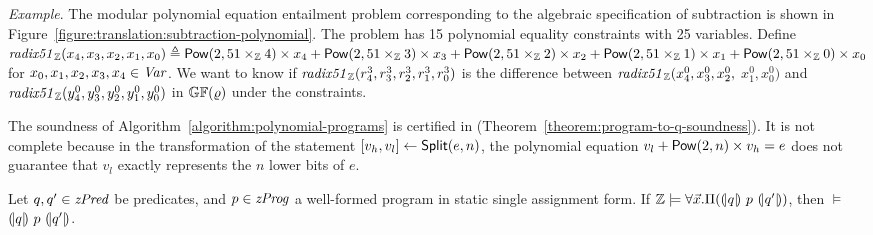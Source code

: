 \noindent
\emph{Example}.
The modular polynomial equation entailment problem corresponding to the
algebraic specification of subtraction is shown in
Figure~\ref{figure:translation:subtraction-polynomial}. The problem
has 15 polynomial equality constraints with 25 variables.
Define $\mathit{radix51}_{\mathbb{Z}}({x}_4, {x}_3, {x}_2, {x}_1, {x}_0) \triangleq \mbox{\textsf{Pow}}(2, 51 \times_{\mathbb{Z}} 4) \times {x}_4 + \mbox{\textsf{Pow}}(2, 51 \times_{\mathbb{Z}} 3) \times {x}_3 + \mbox{\textsf{Pow}}(2, 51 \times_{\mathbb{Z}} 2) \times {x}_2 + \mbox{\textsf{Pow}}(2, 51 \times_{\mathbb{Z}} 1) \times {x}_1 + \mbox{\textsf{Pow}}(2, 51 \times_{\mathbb{Z}} 0) \times {x}_0$ for ${x}_0, {x}_1, {x}_2, {x}_3, {x}_4 \in \mathit{Var}$.
We want to know if $\mathit{radix51}_{\mathbb{Z}}({r}^3_4, {r}^3_3, {r}^3_2,
{r}^3_1, {r}^3_0)$ is the difference between $\mathit{radix51}_{\mathbb{Z}}({x}^0_4,
{x}^0_3, {x}^0_2,$ ${x}^0_1, {x}^0_0)$ and $\mathit{radix51}_{\mathbb{Z}}({y}^0_4,
{y}^0_3, {y}^0_2, {y}^0_1, {y}^0_0)$ in $\mathbb{GF}(\varrho)$ under the
constraints.

The soundness of Algorithm~\ref{algorithm:polynomial-programs}
is certified in \coq (Theorem~\ref{theorem:program-to-q-soundness}).
It is not complete because in the transformation of the statement ${[}{v_h}, {v_l}{]} \leftarrow \mbox{\textsf{Split}}(e, n)$, the polynomial equation $v_l + \mbox{\textsf{Pow}}(2, n) \times v_h = e$ does not guarantee that $v_l$ exactly represents the $n$ lower bits of $e$.
\begin{theorem}
  \label{theorem:program-to-q-soundness}
  Let $q, q' \in \mathit{zPred}$ be predicates, and $p \in \mathit{zProg}$ a well-formed
  program in static single assignment form.
  If $\mathbb{Z} \models \forall \vec{x}.\Pi({(\!|}{q}{|\!)}~{p}~{(\!|}{q'}{|\!)})$, then
  $\models$ ${(\!|}{q}{|\!)}~{p}~{(\!|}{q'}{|\!)}$.
\end{theorem}

